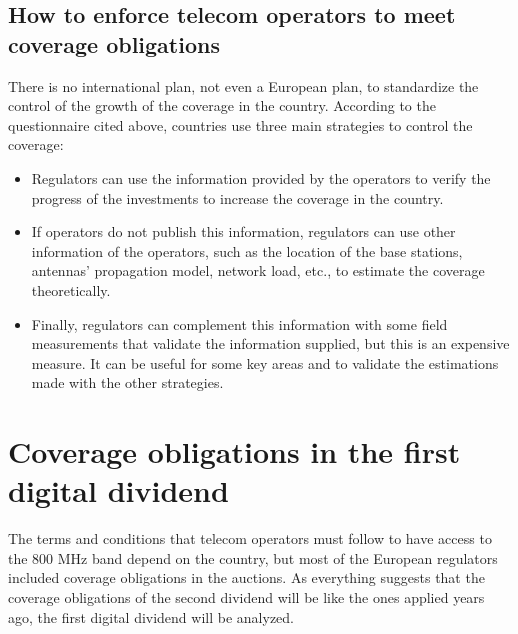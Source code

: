 \subsection*{How to enforce telecom operators to meet coverage obligations}
There is no international plan, not even a European plan, to standardize the control of the growth of the coverage in the country. According to the questionnaire cited above, countries use three main strategies to control the coverage:\par

\begin{itemize}
	\item Regulators can use the information provided by the operators to verify the progress of the investments to increase the coverage in the country.\par

	\item If operators do not publish this information, regulators can use other information of the operators, such as the location of the base stations, antennas’ propagation model, network load, etc., to estimate the coverage theoretically.\par

	\item Finally, regulators can complement this information with some field measurements that validate the information supplied, but this is an expensive measure. It can be useful for some key areas and to validate the estimations made with the other strategies.
\end{itemize}\par















\section{Coverage obligations in the first digital dividend}
The terms and conditions that telecom operators must follow to have access to the 800 MHz band depend on the country, but most of the European regulators included coverage obligations in the auctions. As everything suggests that the coverage obligations of the second dividend will be like the ones applied years ago, the first digital dividend will be analyzed.\par

